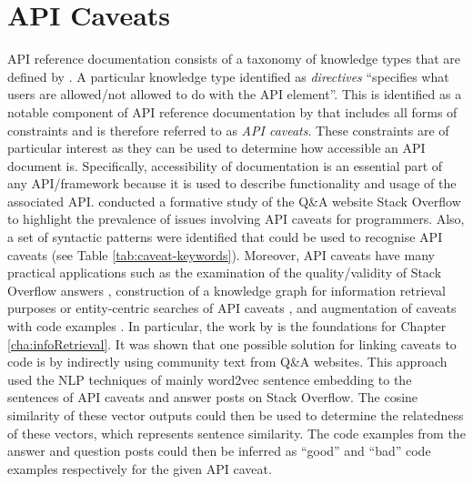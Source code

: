 \section{API Caveats}
\label{sec:related-api-caveats}
API reference documentation consists of a taxonomy of knowledge types that are defined by \cite{maalej2013patterns}. A particular knowledge type identified as \textit{directives} ``specifies what users are allowed/not allowed to do with the API element''. This is identified as a notable component of API reference documentation by \cite{caveat-knowledge-graph} that includes all forms of constraints and is therefore referred to as \textit{API caveats}. These constraints are of particular interest as they can be used to determine how accessible an API document is. Specifically, accessibility of documentation is an essential part of any API/framework because it is used to describe functionality and usage of the associated API. \citeauthor{caveat-knowledge-graph} conducted a formative study of the Q\&A website Stack Overflow to highlight the prevalence of issues involving API caveats for programmers. Also, a set of syntactic patterns were identified that could be used to recognise API caveats (see Table \ref{tab:caveat-keywords}). Moreover, API caveats have many practical applications such as the examination of the quality/validity of Stack Overflow answers \cite{xiaoxue}, construction of a knowledge graph for information retrieval purposes or entity-centric searches of API caveats \cite{construct-knowledge-graph}, and augmentation of caveats with code examples \cite{jiamou}. In particular, the work by \cite{jiamou} is the foundations for Chapter \ref{cha:infoRetrieval}. It was shown that one possible solution for linking caveats to code is by indirectly using community text from Q\&A websites. This approach used the NLP techniques of mainly word2vec sentence embedding to the sentences of API caveats and answer posts on Stack Overflow. The cosine similarity of these vector outputs could then be used to determine the relatedness of these vectors, which represents sentence similarity. The code examples from the answer and question posts could then be inferred as ``good'' and ``bad'' code examples respectively for the given API caveat. 

